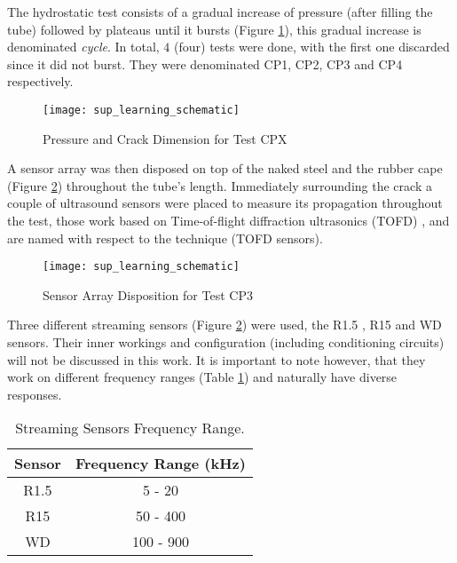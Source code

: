 
The hydrostatic test consists of a gradual increase of pressure (after filling the tube) followed by plateaus until it bursts (Figure \ref{fig:pressure_time}), this gradual increase is denominated \textit{cycle}. In total, $4$ (four) tests were done, with the first one discarded since it did not burst. They were denominated CP1, CP2, CP3 and CP4 respectively.

\begin{figure}[H]
	\centering
	\texttt{[image: sup\_learning\_schematic]}
	\caption{Pressure and Crack Dimension for Test CPX}
	\label{fig:pressure_time}
\end{figure}

A sensor array was then disposed on top of the naked steel and the rubber cape (Figure \ref{fig:sensor_disposition}) throughout the tube's length. Immediately surrounding the crack a couple of ultrasound sensors were placed to measure its propagation throughout the test, those work based on Time-of-flight diffraction ultrasonics (TOFD) \cite{charlesworthEngineeringApplicationsUltrasonic2001}, \cite{silkPotentialScatteredDiffracted1975} and are named with respect to the technique (TOFD sensors).


\begin{figure}[H]
	\centering
	\texttt{[image: sup\_learning\_schematic]}
	\caption{Sensor Array Disposition for Test CP3}
	\label{fig:sensor_disposition}
\end{figure}

Three different streaming sensors (Figure \ref{fig:sensor_disposition}) were used, the R1.5 \cite{physicalacousticsR1520KHz}, R15\cite{physicalacousticsR15IAST150KHz} and WD \cite{physicalacousticsWD100900KHz} sensors. Their inner workings and configuration (including conditioning circuits) will not be discussed in this work. It is important to note however, that they work on different frequency ranges (Table \ref{tab:sensor_freq}) and naturally have diverse responses.

\begin{table}[H] \label{tab:sensor_freq}
	\centering
	\caption{Streaming Sensors Frequency Range.}
	\begin{tabular}{cc}
		\hline
		Sensor & Frequency Range (kHz) \\ \hline
		R1.5   & 5 - 20                \\
		R15    & 50 - 400              \\
		WD     & 100 - 900             \\ \hline
	\end{tabular}
\end{table}

